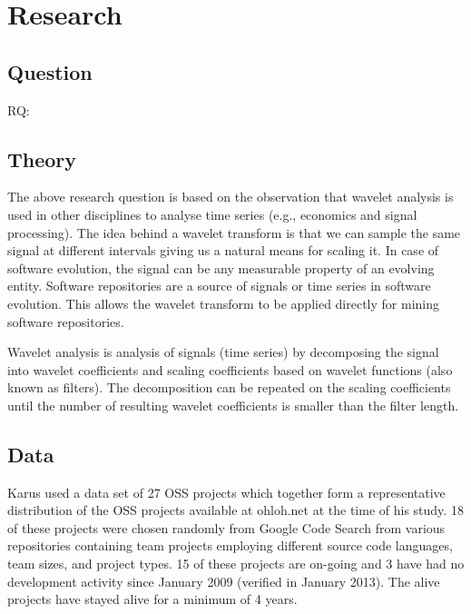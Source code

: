 \section{Research}


\subsection{Question}

\begin{description}
	\item[RQ:] \emph{\researchQuestion}
\end{description}

\subsection{Theory}
The above research question is based on the observation that wavelet analysis is
used in other disciplines to analyse time series (e.g., economics and signal
processing). The idea behind a wavelet transform is that we can sample the same
signal at different intervals giving us a natural means for scaling it. In case
of software evolution, the signal can be any measurable property of an evolving
entity. Software repositories are a source of signals or time series in software
evolution. This allows the wavelet transform to be applied directly for mining
software repositories.

Wavelet analysis is analysis of signals (time series) by decomposing the signal
into wavelet coefficients and scaling coefficients based on wavelet functions
(also known as filters). The decomposition can be repeated on the scaling
coefficients until the number of resulting wavelet coefficients is smaller than
the filter length.

\subsection{Data}
Karus used a data set of 27 OSS projects which together form a representative
distribution of the OSS projects available at ohloh.net at the time of his
study. 18 of these projects were chosen randomly from Google Code Search from
various repositories containing team projects employing different source code
languages, team sizes, and project types. 15 of these projects are on-going and
3 have had no development activity since January 2009 (verified in January
2013). The alive projects have stayed alive for a minimum of 4 years.

